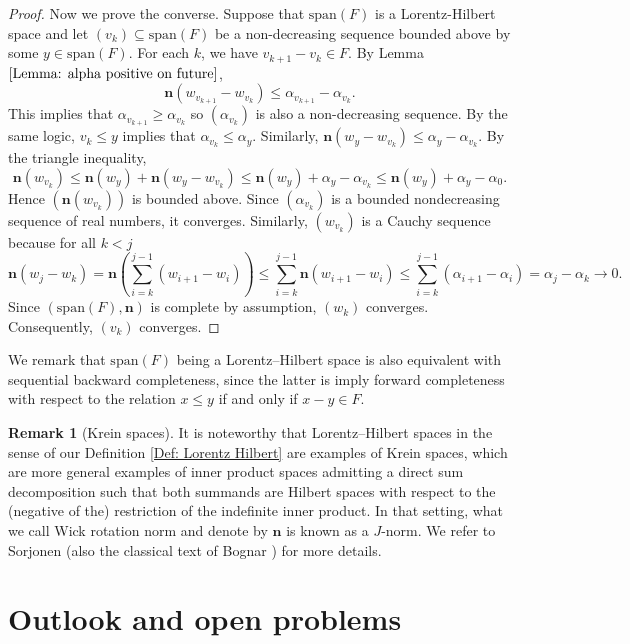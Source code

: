 \documentclass[a4paper,11pt]{article}
\numberwithin{equation}{section}
\theoremstyle{definition}
\newtheorem{Remark}[Definition]{Remark}
\theoremstyle{plain}
\newcommand{\spn}{\mathrm{span}}
\begin{document}
\begin{proof}
    Now we prove the converse. Suppose that $\spn(F)$ is a Lorentz-Hilbert space and let $(v_{k}) \subseteq \spn(F)$ be a non-decreasing sequence bounded above by some $y \in \spn(F)$. For each $k$, we have $v_{k + 1} - v_{k} \in F$. By Lemma $\ref{Lemma: alpha positive on future}$,
    $$\mathbf n(w_{v_{k + 1}} - w_{v_{k}}) \leq \alpha_{v_{k + 1}} - \alpha_{v_{k}}.$$
    This implies that $\alpha_{v_{k + 1}} \geq \alpha_{v_{k}}$ so $(\alpha_{v_{k}})$ is also a non-decreasing sequence. By the same logic, $v_{k} \leq y$ implies that $\alpha_{v_{k}} \leq \alpha_{y}$. Similarly, $\mathbf n(w_{y} - w_{v_{k}}) \leq \alpha_{y} - \alpha_{v_{k}}$. By the triangle inequality,
    $$\mathbf n(w_{v_{k}}) \leq \mathbf n(w_y) + \mathbf n(w_{y} - w_{v_k}) \leq \mathbf n(w_y) + \alpha_{y} - \alpha_{v_{k}} \leq \mathbf n(w_y) + \alpha_{y} - \alpha_{0}.$$
    Hence $(\mathbf n(w_{v_{k}}))$ is bounded above. Since $(\alpha_{v_{k}})$ is a bounded nondecreasing sequence of real numbers, it converges. Similarly, $(w_{v_{k}})$ is a Cauchy sequence because for all $k < j$
    $$\mathbf n(w_{j} - w_{k}) = \mathbf n\left(\sum_{i = k}^{j - 1}(w_{i + 1} - w_{i})\right) \leq \sum_{i = k}^{j - 1} \mathbf n(w_{i + 1} - w_{i}) \leq \sum_{i = k}^{j - 1}(\alpha_{i + 1} - \alpha_{i}) = \alpha_{j} - \alpha_{k} \to 0.$$
    Since $(\spn(F),\mathbf n)$ is complete by assumption, $(w_{k})$ converges. Consequently, $(v_{k})$ converges.
\end{proof}

We remark that $\spn(F)$ being a Lorentz--Hilbert space is also equivalent with sequential backward completeness, since the latter is imply forward completeness with respect to the relation $x \leq y$ if and only if $x - y \in F$.

\begin{Remark}[Krein spaces]

It is noteworthy that Lorentz--Hilbert spaces in the sense of our Definition \ref{Def: Lorentz Hilbert} are examples of Krein spaces, which are more general examples of inner product spaces admitting a direct sum decomposition such that both summands are Hilbert spaces with respect to the (negative of the) restriction of the indefinite inner product. In that setting, what we call Wick rotation norm and denote by $\mathbf n$ is known as a $J$-norm. We refer to Sorjonen \cite{Pekka} (also the classical text of Bognar \cite{Bognar}) for more details.
\end{Remark}

\section{Outlook and open problems}\label{Section: Outlook}
\end{document}
